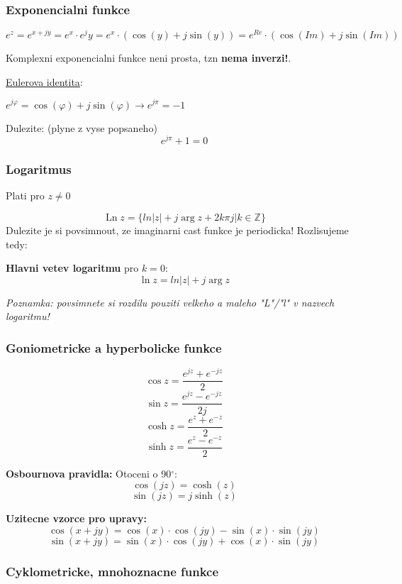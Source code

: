 \subsubsection*{Exponencialni funkce}
$$e^z = e^{x+jy} = e^x\cdot e^jy = e^x \cdot (\operatorname{cos}(y)+j\operatorname{sin}(y)) = e^{Re}\cdot (\operatorname{cos}(Im)+j\operatorname{sin}(Im))$$

Komplexni exponencialni funkce neni prosta, tzn \textbf{nema inverzi!}.

\underline{Eulerova identita}: 

$e^{j\varphi} = \operatorname{cos}(\varphi)+j\operatorname{sin}(\varphi) \rightarrow e^{j\pi} = -1$

Dulezite:  (plyne z vyse popsaneho)
$$e^{j\pi} +1 = 0$$

\subsubsection*{Logaritmus}
Plati pro $z \neq 0$

$$\operatorname{Ln}z = \{ ln|z|+j\operatorname{arg}z + 2k\pi j | k\in \mathbb{Z}\}$$
Dulezite je si povsimnout, ze imaginarni cast funkce je periodicka! Rozlisujeme tedy:

\textbf{Hlavni vetev logaritmu} pro $k = 0$:
$$\operatorname{ln} z = ln|z|+j\operatorname{arg}z$$

\textit{Poznamka: povsimnete si rozdilu pouziti velkeho a maleho "L"/"l" v nazvech logaritmu!}

\subsubsection*{Goniometricke a hyperbolicke funkce}

$$\operatorname{cos}z = \frac{e^{jz}+e^{-jz}}{2}$$
$$\operatorname{sin}z = \frac{e^{jz}-e^{-jz}}{2j}$$
$$\operatorname{cosh}z = \frac{e^{z}+e^{-z}}{2}$$
$$\operatorname{sinh}z = \frac{e^{z}-e^{-z}}{2}$$

\textbf{Osbournova pravidla:}
Otoceni o 90$^\circ$:
$$\operatorname{cos}(jz) = \operatorname{cosh}(z)$$
$$\operatorname{sin}(jz) = j\operatorname{sinh}(z)$$

\textbf{Uzitecne vzorce pro upravy:}
$$\operatorname{cos}(x+jy) = \operatorname{cos}(x)\cdot \operatorname{cos}(jy)-\operatorname{sin}(x)\cdot \operatorname{sin}(jy)$$
$$\operatorname{sin}(x+jy) = \operatorname{sin}(x)\cdot \operatorname{cos}(jy)+\operatorname{cos}(x)\cdot \operatorname{sin}(jy)$$

\subsubsection*{Cyklometricke, mnohoznacne funkce}

